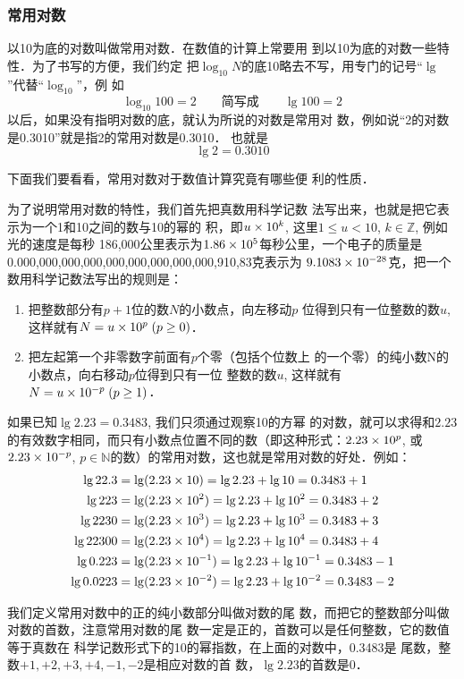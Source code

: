 \subsubsection{常用对数}
    以10为底的对数叫做常用对数．在数值的计算上常要用
    到以10为底的对数一些特性．为了书写的方便，我们约定
    把$\log_{10}N$的底10略去不写，用专门的记号“$\lg$”代替“$\log_{10}$”，例
    如
\[ \log_{10} 100=2 \qquad \text{简写成}\qquad  \lg100=2\]
    以后，如果没有指明对数的底，就认为所说的对数是常用对
    数，例如说“2的对数是0.3010”就是指2的常用对数是0.3010．
    也就是
 \[   \lg 2=0.3010\]
  
 下面我们要看看，常用对数对于数值计算究竟有哪些便
    利的性质．

为了说明常用对数的特性，我们首先把真数用科学记数
法写出来，也就是把它表示为一个1和10之间的数与10的幂的
积，即$u\times10^k$, 这里$1\le u<10$, $k\in\mathbb{Z}$, 例如光的速度是每秒
186,000公里表示为$1.86\times10^5$每秒公里，一个电子的质量是
0.000,000,000,000,000,000,000,000,000,910,83克表示为
$9.1083\times10^{-28}$克，把一个数用科学记数法写出的规则是：

\begin{enumerate}
    \item 把整数部分有$p+1$位的数$N$的小数点，向左移动$p$
    位得到只有一位整数的数$u$, 这样就有$N=u\times10^p\; (p\ge0)$．
    \item 把左起第一个非零数字前面有$p$个零（包括个位数上
    的一个零）的纯小数N的小数点，向右移动$p$位得到只有一位
    整数的数$u$, 这样就有$N=u\times10^{-p}\; (p\ge1)$．
\end{enumerate}

如果已知$\lg2.23=0.3483$, 我们只须通过观察10的方幂
    的对数，就可以求得和$2.23$的有效数字相同，而只有小数点位置不同的数（即这种形式：$2.23\times10^p$, 或$2.23\times10^{-p}$,
    $p\in\mathbb{N}$的数）的常用对数，这也就是常用对数的好处．例如：
\[\begin{split}
\lg22.3&=\lg(2.23\times 10)=\lg2.23+\lg 10=0.3483+1\\
\lg223&=\lg(2.23\times 10^2)=\lg2.23+\lg 10^2=0.3483+2\\
\lg2230&=\lg(2.23\times 10^3)=\lg2.23+\lg 10^3=0.3483+3\\
\lg22300&=\lg(2.23\times 10^4)=\lg2.23+\lg 10^4=0.3483+4\\
\lg0.223&=\lg(2.23\times 10^{-1})=\lg2.23+\lg 10^{-1}=0.3483-1\\
\lg0.0223&=\lg(2.23\times 10^{-2})=\lg2.23+\lg 10^{-2}=0.3483-2
\end{split}\]

我们定义常用对数中的正的纯小数部分叫做对数的尾
数，而把它的整数部分叫做对数的首数，注意常用对数的尾
数一定是正的，首数可以是任何整数，它的数值等于真数在
科学记数形式下的10的幂指数，在上面的对数中，0.3483是
尾数，整数$+1,+2,+3,+4,-1,-2$是相应对数的首
数，$\lg2.23$的首数是0．

